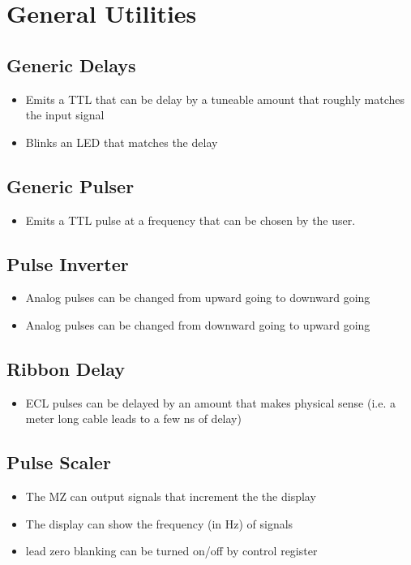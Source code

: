 \documentclass[11pt,a4paper]{article}
\begin{document}
\section{General Utilities}
\subsection{Generic Delays}
\begin{itemize}
\item Emits a TTL that can be delay by a tuneable amount that roughly matches the input signal
\item Blinks an LED that matches the delay
\end{itemize}
\subsection{Generic Pulser}
\begin{itemize}
\item Emits a TTL pulse at a frequency that can be chosen by the user.
\end{itemize}
\subsection{Pulse Inverter}
\begin{itemize}
\item Analog pulses can be changed from upward going to downward going
\item Analog pulses can be changed from downward going to upward going
\end{itemize}

\subsection{Ribbon Delay}
\begin{itemize}
\item ECL pulses can be delayed by an amount that makes physical sense 
(i.e. a meter long cable leads to a few ns of delay)
\end{itemize}

\subsection{Pulse Scaler}
\begin{itemize}
\item The MZ can output signals that increment the the display
\item The display can show the frequency (in Hz) of signals
\item lead zero blanking can be turned on/off by control register
\end{itemize}
\end{document}
